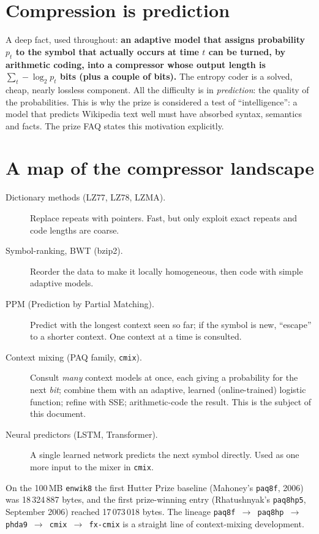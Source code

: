 \documentclass[11pt,a4paper,openany]{book}
\newcommand{\code}[1]{\texttt{#1}}
\theoremstyle{definition}
\theoremstyle{remark}
\begin{document}
\section{Compression is prediction}

A deep fact, used throughout: \textbf{an adaptive model that assigns probability $p_t$ to the symbol that actually occurs at time $t$ can be turned, by arithmetic coding, into a compressor whose output length is $\sum_t -\log_2 p_t$ bits (plus a couple of bits).} The entropy coder is a solved, cheap, nearly lossless component. All the difficulty is in \emph{prediction}: the quality of the probabilities. This is why the prize is considered a test of ``intelligence'': a model that predicts Wikipedia text well must have absorbed syntax, semantics and facts. The prize FAQ states this motivation explicitly.

\section{A map of the compressor landscape}

\begin{description}
\item[Dictionary methods (LZ77, LZ78, LZMA).] Replace repeats with pointers. Fast, but only exploit exact repeats and code lengths are coarse.
\item[Symbol-ranking, BWT (bzip2).] Reorder the data to make it locally homogeneous, then code with simple adaptive models.
\item[PPM (Prediction by Partial Matching).] Predict with the longest context seen so far; if the symbol is new, ``escape'' to a shorter context. One context at a time is consulted.
\item[Context mixing (PAQ family, \code{cmix}).] Consult \emph{many} context models at once, each giving a probability for the next \emph{bit}; combine them with an adaptive, learned (online-trained) logistic function; refine with SSE; arithmetic-code the result. This is the subject of this document.
\item[Neural predictors (LSTM, Transformer).] A single learned network predicts the next symbol directly. Used as one more input to the mixer in \code{cmix}.
\end{description}

On the 100\,MB \code{enwik8} the first Hutter Prize baseline (Mahoney's \code{paq8f}, 2006) was 18\,324\,887 bytes, and the first prize-winning entry (Rhatushnyak's \code{paq8hp5}, September 2006) reached 17\,073\,018 bytes. The lineage \code{paq8f $\to$ paq8hp $\to$ phda9 $\to$ cmix $\to$ fx-cmix} is a straight line of context-mixing development.
\end{document}
